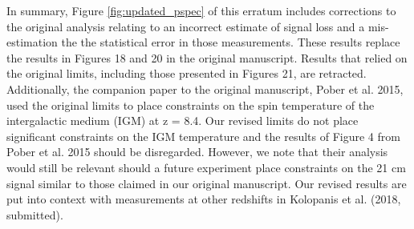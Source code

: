 \documentclass[onecolumn]{emulateapj} \shorttitle{}
\newcommand{\kolopaniscitet}{Kolopanis et al. (2018, submitted)}
\begin{document}
In summary, Figure \ref{fig:updated_pspec} of this erratum includes corrections
to the original analysis relating to an incorrect estimate of signal loss and a
mis-estimation the the statistical error in those measurements.  These results
replace the results in Figures 18 and 20 in the original manuscript.  Results
that relied on the original limits, including those presented in Figures 21,
are retracted.  Additionally, the companion paper to the original manuscript,
Pober et al. 2015, used the original limits to place constraints on the spin
temperature of the intergalactic medium (IGM) at z = 8.4.  Our revised limits
do not place significant constraints on the IGM temperature and the results of
Figure 4 from Pober et al. 2015 should be disregarded.  However, we note that
their analysis would still be relevant should a future experiment place
constraints on the 21 cm signal similar to those claimed in our original
manuscript.
Our revised results are put into context with measurements at other redshifts in \kolopaniscitet.  
\end{document}

